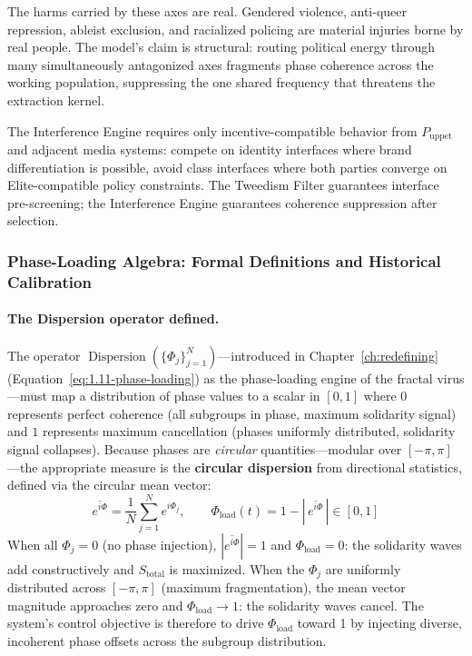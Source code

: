 The harms carried by these axes are real. Gendered violence, anti-queer repression, ableist exclusion, and racialized policing are material injuries borne by real people. The model's claim is structural: routing political energy through many simultaneously antagonized axes fragments phase coherence across the working population, suppressing the one shared frequency that threatens the extraction kernel.

The Interference Engine requires only incentive-compatible behavior from $P_{\text{uppet}}$ and adjacent media systems: compete on identity interfaces where brand differentiation is possible, avoid class interfaces where both parties converge on Elite-compatible policy constraints. The Tweedism Filter guarantees interface pre-screening; the Interference Engine guarantees coherence suppression after selection.

\subsubsection{Phase-Loading Algebra: Formal Definitions and Historical Calibration}
\label{sec:phase_loading_algebra}

\paragraph{The Dispersion operator defined.}
The operator $\operatorname{Dispersion}(\{\Phi_j\}_{j=1}^N)$---introduced in Chapter~\ref{ch:redefining} (Equation~\ref{eq:1.11-phase-loading}) as the phase-loading engine of the fractal virus---must map a distribution of phase values to a scalar in $[0,1]$ where $0$ represents perfect coherence (all subgroups in phase, maximum solidarity signal) and $1$ represents maximum cancellation (phases uniformly distributed, solidarity signal collapses). Because phases are \textit{circular} quantities---modular over $[-\pi, \pi]$---the appropriate measure is the \textbf{circular dispersion} from directional statistics, defined via the circular mean vector:
\begin{equation}\label{eq:8.17-circular-dispersion-operator}
\overline{e^{i\Phi}} = \frac{1}{N}\sum_{j=1}^{N} e^{i\Phi_j}, \qquad
\Phi_{\text{load}}(t) = 1 - \left|\,\overline{e^{i\Phi}}\,\right| \in [0,1]
\end{equation}
When all $\Phi_j = 0$ (no phase injection), $|\overline{e^{i\Phi}}| = 1$ and $\Phi_{\text{load}} = 0$: the solidarity waves add constructively and $S_{\text{total}}$ is maximized. When the $\Phi_j$ are uniformly distributed across $[-\pi,\pi]$ (maximum fragmentation), the mean vector magnitude approaches zero and $\Phi_{\text{load}} \to 1$: the solidarity waves cancel. The system's control objective is therefore to drive $\Phi_{\text{load}}$ toward 1 by injecting diverse, incoherent phase offsets across the subgroup distribution.

